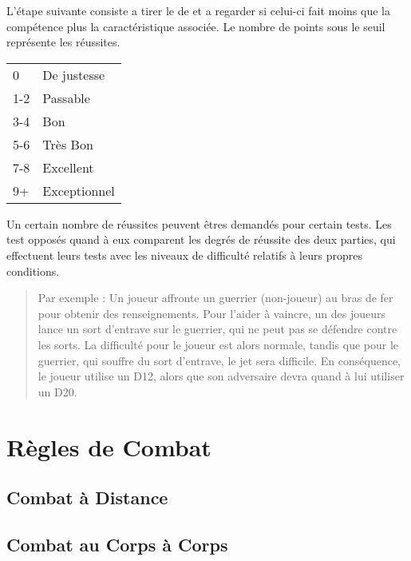 L'étape suivante consiste a tirer le de et a regarder si celui-ci fait moins que la compétence plus la caractéristique associée. Le nombre de points sous le seuil représente les réussites.
\begin{center}
\begin{tabular}{ll}
0   & De justesse\\
1-2 & Passable\\
3-4 & Bon\\
5-6 & Très Bon\\
7-8 & Excellent\\
9+  & Exceptionnel
\end{tabular}
\end{center}
Un certain nombre de réussites peuvent êtres demandés pour certain tests. 
Les test opposés quand à eux comparent les degrés de réussite des deux parties, 
qui effectuent leurs tests avec les niveaux de difficulté relatifs à leurs propres conditions.
\begin{quote}
    Par exemple : Un joueur affronte un guerrier (non-joueur) au bras de fer  pour obtenir des renseignements. 
    Pour l'aider à vaincre, un des joueurs lance un sort d'entrave sur le guerrier, qui ne peut pas se défendre contre les sorts. 
    La difficulté pour le joueur est alors normale, tandis que pour le guerrier, qui souffre du sort d'entrave, le jet sera difficile. 
    En conséquence, le joueur utilise un D12, alors que son adversaire devra quand à lui utiliser un D20.
\end{quote}

\section{Règles de Combat}
\subsection{Combat à Distance}
\subsection{Combat au Corps à Corps}

